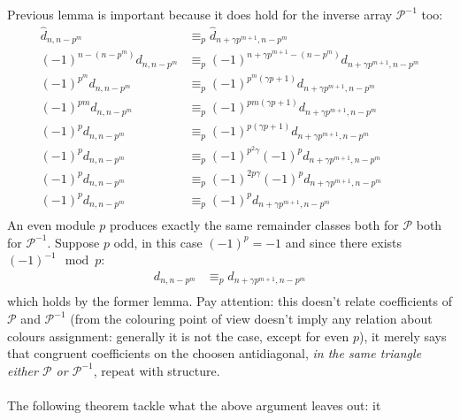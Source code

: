 \documentclass[11pt,a4paper]{article} %
\begin{document}
    Previous lemma is important because it does hold for the inverse array $\mathcal{P}^{-1}$ too:
    \begin{displaymath}
        \begin{split}
            \hat{d}_{n,n-p^{m}} &\equiv_{p} \hat{d}_{n+\gamma p^{m+1}, n-p^{m}} \\
            (-1)^{n-(n-p^{m})}d_{n,n-p^{m}} &\equiv_{p} (-1)^{n+\gamma p^{m+1}-(n-p^{m})}d_{n+\gamma p^{m+1}, n-p^{m}} \\
            (-1)^{p^{m}}d_{n,n-p^{m}} &\equiv_{p} (-1)^{p^{m}(\gamma p+1)}d_{n+\gamma p^{m+1}, n-p^{m}} \\
            (-1)^{p m}d_{n,n-p^{m}} &\equiv_{p} (-1)^{p{m}(\gamma p+1)}d_{n+\gamma p^{m+1}, n-p^{m}} \\
            (-1)^{p}d_{n,n-p^{m}} &\equiv_{p} (-1)^{p(\gamma p+1)}d_{n+\gamma p^{m+1}, n-p^{m}} \\
            (-1)^{p}d_{n,n-p^{m}} &\equiv_{p} (-1)^{p^2\gamma}(-1)^p d_{n+\gamma p^{m+1}, n-p^{m}} \\
            (-1)^{p}d_{n,n-p^{m}} &\equiv_{p} (-1)^{2p \gamma}(-1)^p d_{n+\gamma p^{m+1}, n-p^{m}} \\
            (-1)^{p}d_{n,n-p^{m}} &\equiv_{p} (-1)^p d_{n+\gamma p^{m+1}, n-p^{m}} \\
        \end{split}
    \end{displaymath}
    An even module $p$ produces exactly the same remainder classes both for $\mathcal{P}$ 
    both for $\mathcal{P}^{-1}$. Suppose $p$ odd, in this case $(-1)^{p} = -1$ and since there
    exists $(-1)^{-1}\mod p$:
    \begin{displaymath}
        \begin{split}
            d_{n,n-p^{m}} &\equiv_{p} d_{n+\gamma p^{m+1}, n-p^{m}} \\
        \end{split}
    \end{displaymath}
    which holds by the former lemma. Pay attention: this doesn't relate coefficients
    of $\mathcal{P}$ and $\mathcal{P}^{-1}$ (from the colouring point of view 
    doesn't imply any relation about colours assignment: generally it is not the case,
    except for even $p$), it merely says that 
    congruent coefficients on the choosen antidiagonal, \emph{in the same triangle
    either $\mathcal{P}$ or $\mathcal{P}^{-1}$}, repeat with structure.
    \\\\
    The following theorem tackle what the above argument leaves out: it 
\end{document}
